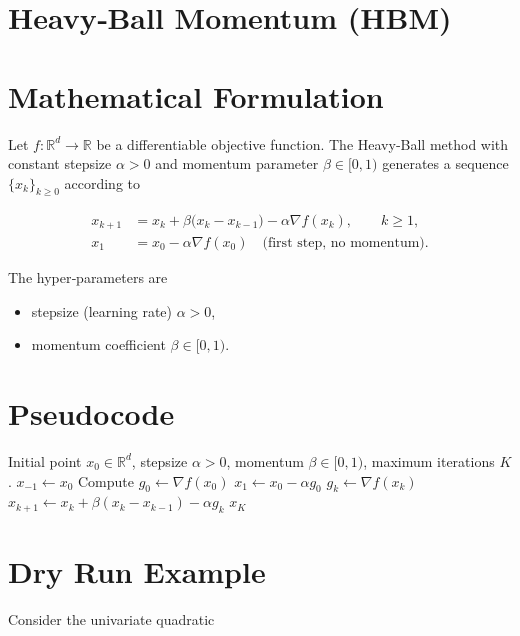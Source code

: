 \documentclass{article}
\begin{document}
\section*{Heavy‑Ball Momentum (HBM)}

\section*{Mathematical Formulation}
Let $f:\mathbb{R}^d\to\mathbb{R}$ be a differentiable objective function.
The Heavy‑Ball method with constant stepsize $\alpha>0$ and momentum
parameter $\beta\in[0,1)$ generates a sequence $\{x_k\}_{k\ge 0}$
according to  

\[
\boxed{
\begin{aligned}
x_{k+1} &= x_k + \beta\bigl(x_k-x_{k-1}\bigr)-\alpha \nabla f(x_k),
\qquad k\ge 1,\\[2mm]
x_1 &= x_0 - \alpha \nabla f(x_0) \quad\text{(first step, no momentum)} .
\end{aligned}}
\]

The hyper‑parameters are  

\begin{itemize}
  \item stepsize (learning rate) $\alpha>0$,
  \item momentum coefficient $\beta\in[0,1)$.
\end{itemize}

\section*{Pseudocode}
\begin{algorithm}[H]
\caption{Heavy‑Ball Momentum}
\begin{algorithmic}[1]
\Require Initial point $x_0\in\mathbb{R}^d$, stepsize $\alpha>0$, momentum $\beta\in[0,1)$,
        maximum iterations $K$.
\State $x_{-1}\gets x_0$ 
\State Compute $g_0 \gets \nabla f(x_0)$
\State $x_1 \gets x_0 - \alpha g_0$ 
    \State $g_k \gets \nabla f(x_k)$
    \State $x_{k+1} \gets x_k + \beta (x_k-x_{k-1}) - \alpha g_k$
\EndFor
\State \Return $x_K$
\end{algorithmic}
\end{algorithm}

\section*{Dry Run Example}
Consider the univariate quadratic  
\end{document}
